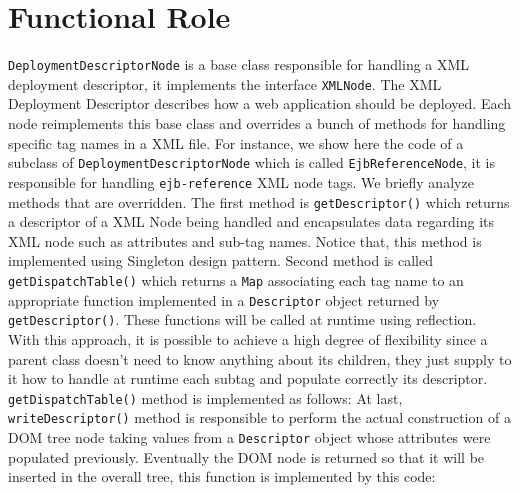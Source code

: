 \newpage
\section{Functional Role}
\texttt{DeploymentDescriptorNode} is a base class responsible for handling a XML deployment descriptor, it implements the interface \texttt{XMLNode}.\newline
The XML Deployment Descriptor describes how a web application should be deployed. Each node reimplements this base class and overrides a bunch of methods for handling specific tag names in a XML file. 
For instance, we show here the code of a subclass of \texttt{DeploymentDescriptorNode} which is called \texttt{EjbReferenceNode}, it is responsible for handling \texttt{ejb-reference} XML node tags. We briefly analyze methods that are overridden. \newline
The first method is \texttt{getDescriptor()} which returns a descriptor of a XML Node being handled and encapsulates data regarding its XML node such as attributes and sub-tag names. 
Notice that, this method is implemented using Singleton design pattern.\newline
Second method is called \texttt{getDispatchTable()} which returns a \texttt{Map} associating each tag name to an appropriate function implemented in a \texttt{Descriptor} object returned by \texttt{getDescriptor()}. These functions will be called at runtime using reflection. With this approach, it is possible to achieve a high degree of flexibility since a parent class doesn't need to know anything about its children, they just supply to it how to handle at runtime each subtag and populate correctly its descriptor. \texttt{getDispatchTable()} method is implemented as follows:
At last, \texttt{writeDescriptor()} method is responsible to perform the actual construction of a DOM tree node taking values from a \texttt{Descriptor} object whose attributes were populated previously. Eventually the DOM node is returned so that it will be inserted in the overall tree, this function is implemented by this code:
